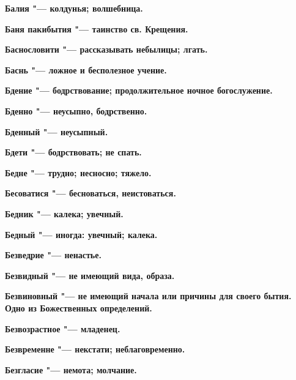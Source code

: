\begin{mymulticols}{2}
\bfseries Балия\normalfont{} "--- колдунья; волшебница. 




\bfseries Баня пакибытия\normalfont{} "--- таинство св. Крещения. 




\bfseries Баснословити\normalfont{} "--- рассказывать небылицы; лгать. 




\bfseries Баснь\normalfont{} "--- ложное и бесполезное учение. 




\bfseries Бдение\normalfont{} "--- бодрствование; продолжительное ночное богослужение. 




\bfseries Бденно\normalfont{} "--- неусыпно, бодрственно. 




\bfseries Бденный\normalfont{} "--- неусыпный. 




\bfseries Бдети\normalfont{} "--- бодрствовать; не спать. 




\bfseries Бедне\normalfont{} "--- трудно; несносно; тяжело. 




\bfseries Бесоватися\normalfont{} "--- бесноваться, неистоваться. 




\bfseries Бедник\normalfont{} "--- калека; увечный. 




\bfseries Бедный\normalfont{} "--- иногда: увечный; калека. 




\bfseries Безведрие\normalfont{} "--- ненастье. 




\bfseries Безвидный\normalfont{} "--- не имеющий вида, образа. 




\bfseries Безвиновный\normalfont{} "--- не имеющий начала или причины для своего бытия. Одно из Божественных определений. 




\bfseries Безвозрастное\normalfont{} "--- младенец. 




\bfseries Безвременне\normalfont{} "--- некстати; неблаговременно. 




\bfseries Безгласие\normalfont{} "--- немота; молчание. 





\end{mymulticols}
